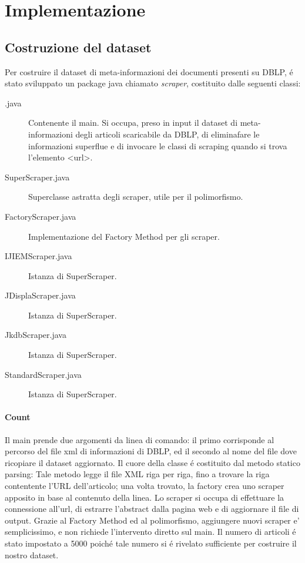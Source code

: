 \documentclass[11pt,a4paper]{article}
\begin{document}
\newpage
\section{Implementazione}
\label{sec:implementation}


\subsection{Costruzione del dataset}
Per costruire il dataset di meta-informazioni dei documenti presenti su DBLP, \'e stato sviluppato un package java chiamato \emph{scraper}, costituito dalle seguenti classi:
\begin{description}
	\item[.java] Contenente il main. Si occupa, preso in input il dataset di meta-informazioni degli articoli scaricabile da DBLP, di eliminafare le informazioni superflue e di invocare le classi di scraping quando si trova l'elemento <url>.
	\item[SuperScraper.java] Superclasse astratta degli scraper, utile per il polimorfismo.
	\item[FactoryScraper.java] Implementazione del Factory Method per gli scraper.
	\item[IJIEMScraper.java] Istanza di SuperScraper.
	\item[JDisplaScraper.java] Istanza di SuperScraper.
	\item[JkdbScraper.java] Istanza di SuperScraper.
	\item[StandardScraper.java] Istanza di SuperScraper.
\end{description}

\paragraph{Count}
\label{par:count}



Il main prende due argomenti da linea di comando: il primo corrisponde al percorso del file xml di informazioni di DBLP, ed il secondo al nome del file dove ricopiare il dataset aggiornato. Il cuore della classe \'e costituito dal metodo statico parsing: Tale metodo legge il file XML riga per riga, fino a trovare la riga contentente l'URL dell'articolo; una volta trovato, la factory crea uno scraper apposito in base al contenuto della linea. Lo scraper si occupa di effettuare la connessione all'url, di estrarre l'abstract dalla pagina web e di aggiornare il file di output. Grazie al Factory Method ed al polimorfismo, aggiungere nuovi scraper e' semplicissimo, e non richiede l'intervento diretto sul main. Il numero di articoli \'e stato impostato a 5000 poich\'e tale numero si \'e rivelato sufficiente per costruire il nostro dataset.
\end{document}
